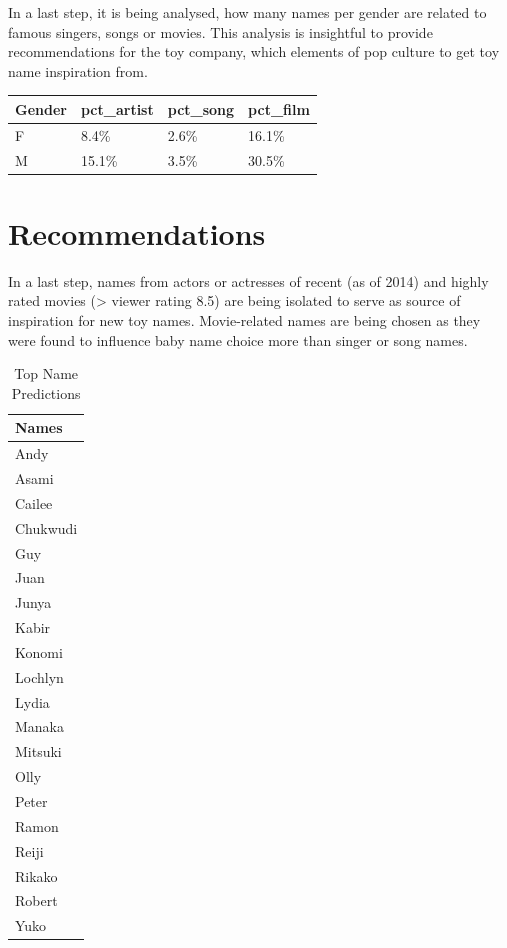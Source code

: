 \documentclass[11pt,preprint]{elsarticle}
\let\origtable\table
\let\endorigtable\endtable
\renewenvironment{table}[1][2] {
    \expandafter\origtable\expandafter[H]
} {
    \endorigtable
}
\numberwithin{equation}{section}
\numberwithin{figure}{section}
\numberwithin{table}{section}
\begin{document}
In a last step, it is being analysed, how many names per gender are
related to famous singers, songs or movies. This analysis is insightful
to provide recommendations for the toy company, which elements of pop
culture to get toy name inspiration from.

\begin{table}
\centering
\caption{\label{tab:spikes}Name Representation in Pop Culture}
\centering
\begin{tabular}[t]{l|l|l|l}
\hline
Gender & pct\_artist & pct\_song & pct\_film\\
\hline
F & 8.4\% & 2.6\% & 16.1\%\\
\hline
M & 15.1\% & 3.5\% & 30.5\%\\
\hline
\end{tabular}
\end{table}

\section{Recommendations}\label{recommendations}

In a last step, names from actors or actresses of recent (as of 2014)
and highly rated movies (\textgreater{} viewer rating 8.5) are being
isolated to serve as source of inspiration for new toy names.
Movie-related names are being chosen as they were found to influence
baby name choice more than singer or song names.

\begin{longtable}[t]{l}
\caption{\label{tab:recommendations}Top Name Predictions}\\
\toprule
Names\\
\midrule
Andy\\
Asami\\
Cailee\\
Chukwudi\\
Guy\\
\addlinespace
Juan\\
Junya\\
Kabir\\
Konomi\\
Lochlyn\\
\addlinespace
Lydia\\
Manaka\\
Mitsuki\\
Olly\\
Peter\\
\addlinespace
Ramon\\
Reiji\\
Rikako\\
Robert\\
Yuko\\
\bottomrule
\end{longtable}
\end{document}

